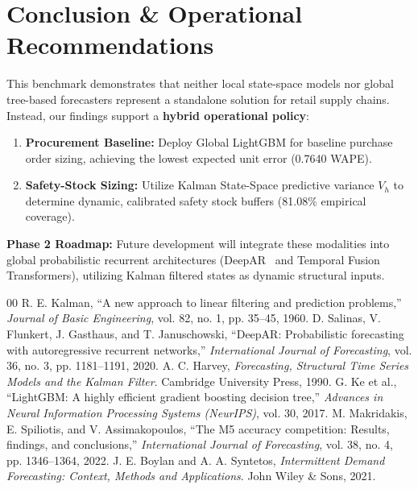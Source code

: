 \documentclass[conference]{IEEEtran}
\begin{document}
\section{Conclusion \& Operational Recommendations}
This benchmark demonstrates that neither local state-space models nor global tree-based forecasters represent a standalone solution for retail supply chains. Instead, our findings support a \textbf{hybrid operational policy}:
\begin{enumerate}
    \item \textbf{Procurement Baseline:} Deploy Global LightGBM for baseline purchase order sizing, achieving the lowest expected unit error (0.7640 WAPE).
    \item \textbf{Safety-Stock Sizing:} Utilize Kalman State-Space predictive variance $V_h$ to determine dynamic, calibrated safety stock buffers (81.08\% empirical coverage).
\end{enumerate}

\textbf{Phase 2 Roadmap:} Future development will integrate these modalities into global probabilistic recurrent architectures (DeepAR~\cite{b2} and Temporal Fusion Transformers), utilizing Kalman filtered states as dynamic structural inputs.

\begin{thebibliography}{00}
 R. E. Kalman, ``A new approach to linear filtering and prediction problems,'' \textit{Journal of Basic Engineering}, vol. 82, no. 1, pp. 35--45, 1960.
 D. Salinas, V. Flunkert, J. Gasthaus, and T. Januschowski, ``DeepAR: Probabilistic forecasting with autoregressive recurrent networks,'' \textit{International Journal of Forecasting}, vol. 36, no. 3, pp. 1181--1191, 2020.
 A. C. Harvey, \textit{Forecasting, Structural Time Series Models and the Kalman Filter}. Cambridge University Press, 1990.
 G. Ke et al., ``LightGBM: A highly efficient gradient boosting decision tree,'' \textit{Advances in Neural Information Processing Systems (NeurIPS)}, vol. 30, 2017.
 M. Makridakis, E. Spiliotis, and V. Assimakopoulos, ``The M5 accuracy competition: Results, findings, and conclusions,'' \textit{International Journal of Forecasting}, vol. 38, no. 4, pp. 1346--1364, 2022.
 J. E. Boylan and A. A. Syntetos, \textit{Intermittent Demand Forecasting: Context, Methods and Applications}. John Wiley \& Sons, 2021.
\end{thebibliography}
\end{document}
